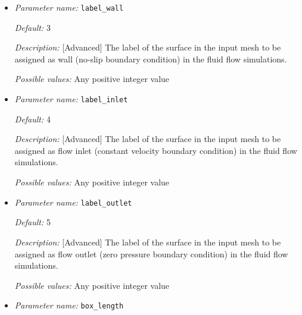 \begin{itemize}

{\it Default:} 2 

{\it Description:} [Standard] The label of the (volume) region which is supposed to be the medium (electrolyte) in the input mesh.

{\it Possible values:} Any positive integer value 


\item {\it Parameter name:} {\tt label\_wall}
\label{parameters:label_wall}


{\it Default:} 3

{\it Description:} [Advanced] The label of the surface in the input mesh to be assigned as wall (no-slip boundary condition) in the fluid flow simulations.

{\it Possible values:} Any positive integer value 


\item {\it Parameter name:} {\tt label\_inlet}
\label{parameters:label_inlet}


{\it Default:} 4

{\it Description:} [Advanced] The label of the surface in the input mesh to be assigned as flow inlet (constant velocity boundary condition) in the fluid flow simulations.

{\it Possible values:} Any positive integer value 


\item {\it Parameter name:} {\tt label\_outlet}
\label{parameters:label_outlet}


{\it Default:} 5

{\it Description:} [Advanced] The label of the surface in the input mesh to be assigned as flow outlet (zero pressure boundary condition) in the fluid flow simulations.

{\it Possible values:} Any positive integer value 


\item {\it Parameter name:} {\tt box\_length}
\label{parameters:box_length}



\end{itemize}
